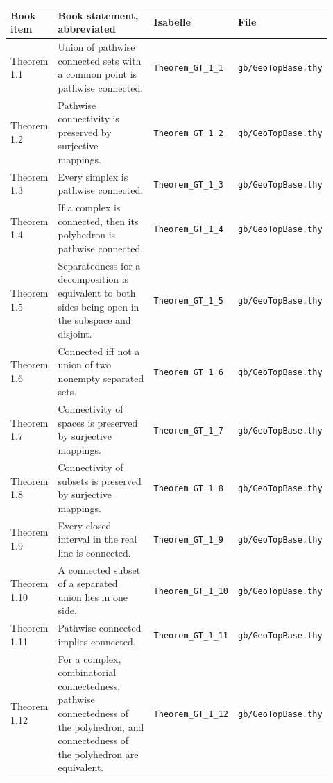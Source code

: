 \documentclass{article}
\begin{document}
\begin{longtable}{>{\raggedright\arraybackslash}p{0.13\linewidth}
                  >{\raggedright\arraybackslash}p{0.45\linewidth}
                  >{\raggedright\arraybackslash}p{0.18\linewidth}
                  >{\raggedright\arraybackslash}p{0.16\linewidth}}
\textbf{Book item} & \textbf{Book statement, abbreviated} & \textbf{Isabelle} & \textbf{File}\\
\hline
Theorem 1.1 & Union of pathwise connected sets with a common point is pathwise connected. & \texttt{Theorem\_GT\_1\_1} & \texttt{gb/GeoTopBase.thy}\\
Theorem 1.2 & Pathwise connectivity is preserved by surjective mappings. & \texttt{Theorem\_GT\_1\_2} & \texttt{gb/GeoTopBase.thy}\\
Theorem 1.3 & Every simplex is pathwise connected. & \texttt{Theorem\_GT\_1\_3} & \texttt{gb/GeoTopBase.thy}\\
Theorem 1.4 & If a complex is connected, then its polyhedron is pathwise connected. & \texttt{Theorem\_GT\_1\_4} & \texttt{gb/GeoTopBase.thy}\\
Theorem 1.5 & Separatedness for a decomposition is equivalent to both sides being open in the subspace and disjoint. & \texttt{Theorem\_GT\_1\_5} & \texttt{gb/GeoTopBase.thy}\\
Theorem 1.6 & Connected iff not a union of two nonempty separated sets. & \texttt{Theorem\_GT\_1\_6} & \texttt{gb/GeoTopBase.thy}\\
Theorem 1.7 & Connectivity of spaces is preserved by surjective mappings. & \texttt{Theorem\_GT\_1\_7} & \texttt{gb/GeoTopBase.thy}\\
Theorem 1.8 & Connectivity of subsets is preserved by surjective mappings. & \texttt{Theorem\_GT\_1\_8} & \texttt{gb/GeoTopBase.thy}\\
Theorem 1.9 & Every closed interval in the real line is connected. & \texttt{Theorem\_GT\_1\_9} & \texttt{gb/GeoTopBase.thy}\\
Theorem 1.10 & A connected subset of a separated union lies in one side. & \texttt{Theorem\_GT\_1\_10} & \texttt{gb/GeoTopBase.thy}\\
Theorem 1.11 & Pathwise connected implies connected. & \texttt{Theorem\_GT\_1\_11} & \texttt{gb/GeoTopBase.thy}\\
Theorem 1.12 & For a complex, combinatorial connectedness, pathwise connectedness of the polyhedron, and connectedness of the polyhedron are equivalent. & \texttt{Theorem\_GT\_1\_12} & \texttt{gb/GeoTopBase.thy}\\

\end{longtable}
\end{document}
